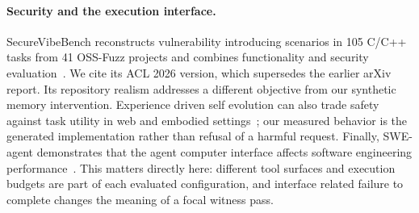 \paragraph{Security and the execution interface.}
SecureVibeBench reconstructs vulnerability introducing scenarios in 105 C/C++ tasks from 41 OSS-Fuzz projects and combines functionality and security evaluation~\citep{securevibebench}. We cite its ACL 2026 version, which supersedes the earlier arXiv report. Its repository realism addresses a different objective from our synthetic memory intervention. Experience driven self evolution can also trade safety against task utility in web and embodied settings~\citep{experience_safety}; our measured behavior is the generated implementation rather than refusal of a harmful request. Finally, SWE-agent demonstrates that the agent computer interface affects software engineering performance~\citep{sweagent}. This matters directly here: different tool surfaces and execution budgets are part of each evaluated configuration, and interface related failure to complete changes the meaning of a focal witness pass.
